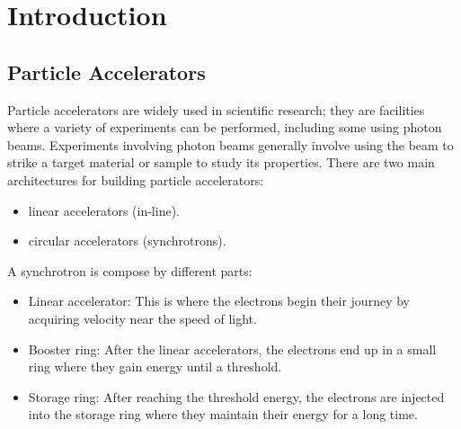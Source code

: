 \chapter{Introduction}

\section{Particle Accelerators}

Particle accelerators are widely used in scientific research; they are facilities where a variety of experiments can be performed, including some using photon beams.
Experiments involving photon beams generally involve using the beam to strike a target material or sample to study its properties.
There are two main architectures for building particle accelerators:

\begin{itemize}
    \item linear accelerators (in-line).
    \item circular accelerators (synchrotrons).
\end{itemize}

A synchrotron is compose by different parts:

\begin{itemize}
    \item Linear accelerator: This is where the electrons begin their journey by acquiring velocity near the speed of light.
    \item Booster ring: After the linear accelerators, the electrons end up in a small ring where they gain energy until a threshold.
    \item Storage ring: After reaching the threshold energy, the electrons are injected into the storage ring where they maintain their energy for a long time.
\end{itemize}

